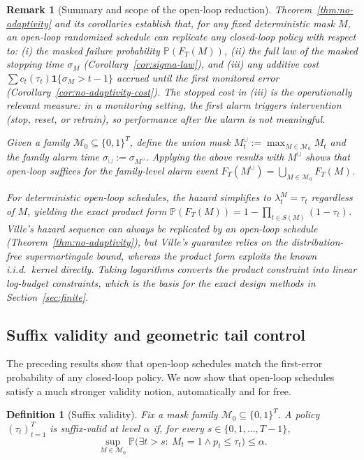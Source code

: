 \documentclass{uai2026} %
\newtheorem{definition}[theorem]{Definition}
\newtheorem*{remark}{Remark}
\newcommand{\1}{\mathbf{1}}
\newcommand{\ind}[1]{\mathbf{1}\{#1\}}
\newcommand{\prob}{\mathbb{P}}
\newcommand{\mcal}{\mathcal{M}}
\begin{document}
\begin{remark}[Summary and scope of the open-loop reduction]
  Theorem~\ref{thm:no-adaptivity} and its corollaries establish that, for any fixed deterministic mask $M$, an open-loop randomized schedule can replicate any closed-loop policy with respect to:
  \emph{(i)} the masked failure probability $\prob(F_{T}(M))$,
  \emph{(ii)} the full law of the masked stopping time $\sigma_{M}$ (Corollary~\ref{cor:sigma-law}), and
  \emph{(iii)} any additive cost $\sum c_{t}(\tau_{t})\ind{\sigma_{M}>t-1}$ accrued until the first monitored error (Corollary~\ref{cor:no-adaptivity-cost}).
  The stopped cost in \emph{(iii)} is the operationally relevant measure: in a monitoring setting, the first alarm triggers intervention (stop, reset, or retrain), so performance after the alarm is not meaningful.

  Given a family $\mcal_{0}\subseteq\{0,1\}^{T}$, define the union mask $M^{\cup}_{t}:=\max_{M\in\mcal_{0}} M_{t}$ and the family alarm time $\sigma_{\cup}:=\sigma_{M^{\cup}}$.
  Applying the above results with $M^{\cup}$ shows that open-loop suffices for the family-level alarm event $F_{T}(M^{\cup})=\bigcup_{M\in\mcal_{0}}F_{T}(M)$.

  For deterministic open-loop schedules, the hazard simplifies to $\lambda_{t}^{M}=\tau_{t}$ regardless of $M$, yielding the exact product form $\prob(F_{T}(M))=1-\prod_{t\in S(M)}(1-\tau_{t})$.
  Ville's hazard sequence can always be replicated by an open-loop schedule (Theorem~\ref{thm:no-adaptivity}), but Ville's guarantee relies on the distribution-free supermartingale bound, whereas the product form exploits the known i.i.d.\ kernel directly.
  Taking logarithms converts the product constraint into linear log-budget constraints, which is the basis for the exact design methods in Section~\ref{sec:finite}.
\end{remark}

\subsection{Suffix validity and geometric tail control}
\label{sec:suffix-validity}

The preceding results show that open-loop schedules match the first-error probability of any closed-loop policy.
We now show that open-loop schedules satisfy a much stronger validity notion, automatically and for free.

\begin{definition}[Suffix validity]
  \label{def:suffix-valid}
  Fix a mask family $\mcal_{0}\subseteq\{0,1\}^{T}$.
  A policy $(\tau_{t})_{t=1}^{T}$ is \emph{suffix-valid at level $\alpha$} if, for every $s\in\{0,1,\dots,T-1\}$,
  \begin{equation*}
    \sup_{M\in\mcal_{0}}\prob\bigl(\exists t>s:\ M_{t}=1 \wedge p_{t}\le\tau_{t}\bigr)\le\alpha.
  \end{equation*}
\end{definition}
\end{document}
